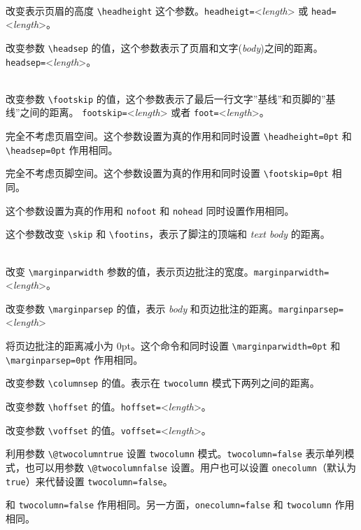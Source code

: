 \documentclass[titlepage]{ctexart}
\newcommand{\gpart}[1]{\textsf{\textsl{\color[rgb]{.0,.45,.7}#1}}}
\newenvironment{Options}%
  {\begin{list}{}{%
   \renewcommand{\makelabel}[1]{\texttt{##1}\hfil}%
   \setlength{\itemsep}{-.5\parsep}
   \settowidth{\labelwidth}{\texttt{xxxxxxxxxxx\space}}%
   \setlength{\leftmargin}{\labelwidth}%
   \addtolength{\leftmargin}{\labelsep}}%
   \raggedright}
  {\end{list}}
\begin{document}
	 \begin{Options}
	 \item[headheight | head]~\\
	 改变表示页眉的高度 \verb|\headheight| 这个参数。\verb|headheigt=|<\emph{length}> 或 \verb|head=|<\emph{length}>。
	 \item[headsep] 改变参数 \verb|\headsep| 的值，这个参数表示了页眉和文字(\gpart{body})之间的距离。\verb|headsep=|<\emph{length}>。
	 \item[footskip | foot]~\\
	 改变参数 \verb|\footskip| 的值，这个参数表示了最后一行文字''基线''和页脚的''基线''之间的距离。
	 \verb|footskip=|<\emph{length}> 或者 \verb|foot=|<\emph{length}>。
	 \item[nohead] 完全不考虑页眉空间。这个参数设置为真的作用和同时设置 \verb|\headheight=0pt| 和 \verb|\headsep=0pt| 作用相同。
	 \item[nofoot] 完全不考虑页脚空间。这个参数设置为真的作用和同时设置 \verb|\footskip=0pt| 相同。
	 \item[noheadfoot] 这个参数设置为真的作用和 \verb|nofoot| 和 \verb|nohead| 同时设置作用相同。
	 \item[footnotesep] 这个参数改变 \verb|\skip| 和 \verb|\footins|，表示了脚注的顶端和 \gpart{text body} 的距离。
	 \item[marginparwidth | marginpar]~\\
	 改变 \verb|\marginparwidth| 参数的值，表示页边批注的宽度。\verb|marginparwidth=|<\emph{length}>。
	 \item[marginparsep] 改变参数 \verb|\marginparsep| 的值，表示 \gpart{body} 和页边批注的距离。\verb|marginparsep=|<\emph{length}>
	 \item[nomarginpar] 将页边批注的距离减小为 0pt。这个命令和同时设置 \verb|\marginparwidth=0pt| 和 \verb|\marginparsep=0pt| 作用相同。
	 \item[columnsep] 改变参数 \verb|\columnsep| 的值。表示在 \verb|twocolumn| 模式下两列之间的距离。
	 \item[hoffset] 改变参数 \verb|\hoffset| 的值。\verb|hoffset=|<\emph{length}>。
	 \item[voffset] 改变参数 \verb|\voffset| 的值。\verb|voffset=|<\emph{length}>。
	 \item[twocolumn] 利用参数 \verb|\@twocolumntrue| 设置 \verb|twocolumn| 模式。\verb|twocolumn=false| 表示单列模式，也可以用参数 \verb|\@twocolumnfalse| 设置。用户也可以设置 \verb|onecolumn|（默认为 \verb|true|）来代替设置 \verb|twocolumn=false|。
	 \item[onecolumn] 和 \verb|twocolumn=false| 作用相同。另一方面，\verb|onecolumn=false| 和 \verb|twocolumn| 作用相同。

\end{Options}
\end{document}
